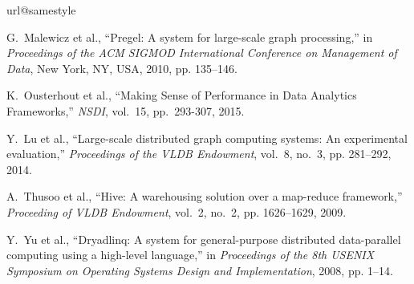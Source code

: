 \documentclass[10pt,journal,compsoc]{IEEEtran}
\begin{document}
% 
% 
%
\begin{thebibliography}{43}
\providecommand{\url}[1]{#1}
\csname url@samestyle\endcsname
\providecommand{\newblock}{\relax}
\providecommand{\bibinfo}[2]{#2}
\providecommand{\BIBentrySTDinterwordspacing}{\spaceskip=0pt\relax}
\providecommand{\BIBentryALTinterwordstretchfactor}{4}
\providecommand{\BIBentryALTinterwordspacing}{\spaceskip=\fontdimen2\font plus
\BIBentryALTinterwordstretchfactor\fontdimen3\font minus
  \fontdimen4\font\relax}
\providecommand{\BIBforeignlanguage}[2]{{%
\expandafter\ifx\csname l@#1\endcsname\relax
\typeout{** WARNING: IEEEtran.bst: No hyphenation pattern has been}%
\typeout{** loaded for the language `#1'. Using the pattern for}%
\typeout{** the default language instead.}%
\else
\language=\csname l@#1\endcsname
\fi
#2}}
\providecommand{\BIBdecl}{\relax}
\BIBdecl

G.~Malewicz et al., ``Pregel: A system for large-scale graph processing,'' in
  \emph{Proceedings of the ACM SIGMOD International Conference on Management of
  Data}, New York, NY, USA, 2010, pp. 135--146.

K.~Ousterhout et al., ``Making Sense of Performance in Data Analytics Frameworks,'' \emph{NSDI}, vol.~15, pp.~293-307, 2015.

Y.~Lu et al., ``Large-scale distributed graph computing
  systems: An experimental evaluation,'' \emph{Proceedings of the VLDB
  Endowment}, vol.~8, no.~3, pp. 281--292, 2014.

A.~Thusoo et al., ``Hive: A warehousing solution over a map-reduce
  framework,'' \emph{Proceeding of VLDB Endowment}, vol.~2, no.~2, pp.
  1626--1629, 2009.

Y.~Yu et al., ``Dryadlinq: A system for general-purpose distributed
  data-parallel computing using a high-level language,'' in \emph{Proceedings
  of the 8th USENIX Symposium on Operating Systems Design and Implementation},
  2008, pp. 1--14.


\end{thebibliography}
\end{document}
